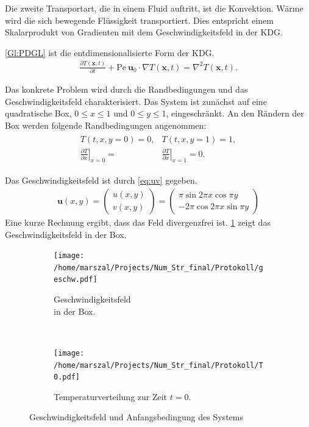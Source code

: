 Die zweite Transportart, die in einem Fluid auftritt, ist die Konvektion. Wärme wird die sich bewegende Flüssigkeit transportiert. Dies entspricht einem Skalarprodukt von Gradienten mit dem Geschwindigkeitsfeld in der KDG.

\cref{Gl:PDGL} ist die entdimensionalisierte Form der KDG.
\begin{align}
  \frac{\partial T(\boldsymbol x, t)}{\partial t} + \text{Pe}~ \boldsymbol{u}_0\cdot \nabla T(\boldsymbol x, t) = \nabla^2 T(\boldsymbol x, t). \label{Gl:PDGL}
\end{align}

Das konkrete Problem wird durch die Randbedingungen und das Geschwindigkeitsfeld charakterisiert.
Das System ist zunächst auf eine quadratische Box, $0\leq x \leq 1$ und $0\leq y \leq 1$, eingeschränkt.
An den Rändern der Box werden folgende Randbedingungen angenommen:
\begin{align}
  \begin{split}
  T(t,x,y=0) = 0, &  T(t,x,y=1)=1, \\
  \left.\frac{\partial T}{\partial x}\right|_{x=0} =& \left.\frac{\partial T}{\partial x}\right|_{x=1} = 0.
\end{split}
\end{align}

Das Geschwindigkeitsfeld ist durch \cref{eq:uv} gegeben.
\begin{align}
  \boldsymbol u(x,y) =
  \begin{pmatrix}
    u(x,y)\\
    v(x,y)
  \end{pmatrix} =
  \begin{pmatrix}
    \pi \sin{2\pi x}\cos{\pi y}\\
    -2\pi \cos{2\pi x}\sin{\pi y}
  \end{pmatrix}\label{eq:uv}
\end{align}
Eine kurze Rechnung ergibt, dass das Feld divergenzfrei ist. \cref{fig:uv} zeigt das Geschwindigkeitsfeld in der Box.
\begin{figure}
  \centering
  \begin{subfigure}[b]{0.45\textwidth}
  \texttt{[image: /home/marszal/Projects/Num\_Str\_final/Protokoll/geschw.pdf]}\caption{\centering Geschwindigkeitsfeld \\ in der Box.}\label{fig:uv}
  \end{subfigure}
  ~
  \begin{subfigure}[b]{0.45\textwidth}
  \texttt{[image: /home/marszal/Projects/Num\_Str\_final/Protokoll/T0.pdf]}\caption{\centering Temperaturverteilung zur Zeit $t=0$.}\label{fig:t0}
  \end{subfigure}
  \caption{Geschwindigkeitsfeld und Anfangsbedingung des Systems}
\end{figure}

